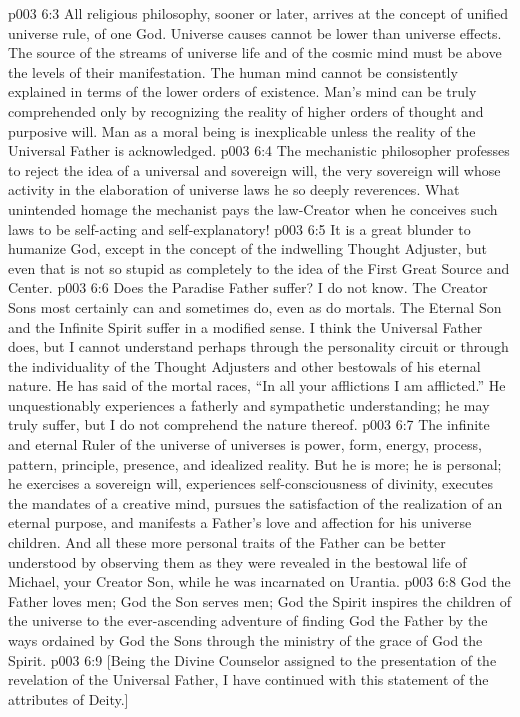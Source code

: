 \pc \vs p003 6:3 All religious philosophy, sooner or later, arrives at the concept of unified universe rule, of one God. Universe causes cannot be lower than universe effects. The source of the streams of universe life and of the cosmic mind must be above the levels of their manifestation. The human mind cannot be consistently explained in terms of the lower orders of existence. Man’s mind can be truly comprehended only by recognizing the reality of higher orders of thought and purposive will. Man as a moral being is inexplicable unless the reality of the Universal Father is acknowledged.\plusone
\vs p003 6:4 The mechanistic philosopher professes to reject the idea of a universal and sovereign will, the very sovereign will whose activity in the elaboration of universe laws he so deeply reverences. What unintended homage the mechanist pays the law\hyp{}Creator when he conceives such laws to be self\hyp{}acting and self\hyp{}explanatory!
\vs p003 6:5 It is a great blunder to humanize God, except in the concept of the indwelling Thought Adjuster, but even that is not so stupid as completely to  the idea of the First Great Source and Center.
\pc \vs p003 6:6 Does the Paradise Father suffer? I do not know. The Creator Sons most certainly can and sometimes do, even as do mortals. The Eternal Son and the Infinite Spirit suffer in a modified sense. I think the Universal Father does, but I cannot understand  perhaps through the personality circuit or through the individuality of the Thought Adjusters and other bestowals of his eternal nature. He has said of the mortal races, “In all your afflictions I am afflicted.” He unquestionably experiences a fatherly and sympathetic understanding; he may truly suffer, but I do not comprehend the nature thereof.\plusone
\pc \vs p003 6:7 The infinite and eternal Ruler of the universe of universes is power, form, energy, process, pattern, principle, presence, and idealized reality. But he is more; he is personal; he exercises a sovereign will, experiences self\hyp{}consciousness of divinity, executes the mandates of a creative mind, pursues the satisfaction of the realization of an eternal purpose, and manifests a Father’s love and affection for his universe children. And all these more personal traits of the Father can be better understood by observing them as they were revealed in the bestowal life of Michael, your Creator Son, while he was incarnated on Urantia.
\pc \vs p003 6:8 God the Father loves men; God the Son serves men; God the Spirit inspires the children of the universe to the ever\hyp{}ascending adventure of finding God the Father by the ways ordained by God the Sons through the ministry of the grace of God the Spirit.
\vsetoff
\vs p003 6:9 [Being the Divine Counselor assigned to the presentation of the revelation of the Universal Father, I have continued with this statement of the attributes of Deity.]

